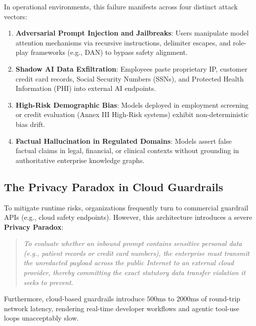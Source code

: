 \documentclass[11pt,a4paper]{article}
\theoremstyle{definition}
\begin{document}
In operational environments, this failure manifests across four distinct attack vectors:
\begin{enumerate}
    \item \textbf{Adversarial Prompt Injection and Jailbreaks}: Users manipulate model attention mechanisms via recursive instructions, delimiter escapes, and role-play frameworks (e.g., DAN) to bypass safety alignment.
    \item \textbf{Shadow AI Data Exfiltration}: Employees paste proprietary IP, customer credit card records, Social Security Numbers (SSNs), and Protected Health Information (PHI) into external AI endpoints.
    \item \textbf{High-Risk Demographic Bias}: Models deployed in employment screening or credit evaluation (Annex III High-Risk systems) exhibit non-deterministic bias drift.
    \item \textbf{Factual Hallucination in Regulated Domains}: Models assert false factual claims in legal, financial, or clinical contexts without grounding in authoritative enterprise knowledge graphs.
\end{enumerate}

\subsection{The Privacy Paradox in Cloud Guardrails}
\label{subsec:privacy_paradox}

To mitigate runtime risks, organizations frequently turn to commercial guardrail APIs (e.g., cloud safety endpoints). However, this architecture introduces a severe \textbf{Privacy Paradox}:

\begin{quote}
\textit{To evaluate whether an inbound prompt contains sensitive personal data (e.g., patient records or credit card numbers), the enterprise must transmit the unredacted payload across the public Internet to an external cloud provider, thereby committing the exact statutory data transfer violation it seeks to prevent.}
\end{quote}

Furthermore, cloud-based guardrails introduce $500\text{ms}$ to $2000\text{ms}$ of round-trip network latency, rendering real-time developer workflows and agentic tool-use loops unacceptably slow.
\end{document}
